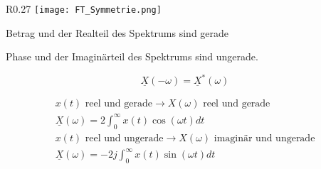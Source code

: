 \begin{mdframed}[style=exercise,frametitle=Symmetrie,nobreak=true]
	\begin{wrapfigure}[10]{R}{0.27\textwidth}
		\vspace{-1.4em}
		\texttt{[image: FT\_Symmetrie.png]}
	\end{wrapfigure}

	\begin{minipage}{5cm}
		Betrag und der Realteil des Spektrums sind gerade\\
	\end{minipage}

	\begin{minipage}{5cm}
		Phase und der Imaginärteil des Spektrums sind ungerade.
	\end{minipage}

	\[
		\underline{X}(-\omega) = \underline{X}^*(\omega)
	\]

	\begin{gather*}
		x(t)\text{ reel und gerade}\rightarrow X(\omega)\text{ reel und gerade}\\
		\underline{X}(\omega) = 2\int_0^\infty x(t)\cos(\omega t)dt\\
		x(t)\text{ reel und ungerade}\rightarrow X(\omega)\text{ imaginär und ungerade}\\
		\underline{X}(\omega) = -2j\int_0^\infty x(t)\sin(\omega t)dt
	\end{gather*}
\end{mdframed}
\newpage
